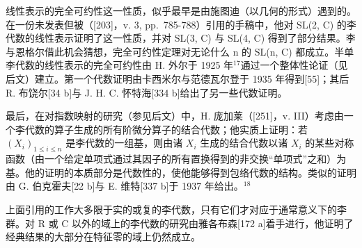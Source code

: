 线性表示的完全可约性这一性质，似乎最早是由施图迪（以几何的形式）遇到的。在一份未发表但被（{[}203{]}，v. 3, pp.~785-788）引用的手稿中，他对 SL(2, C) 的李代数的线性表示证明了这一性质，并对 SL(3, C) 与 SL(4, C) 得到了部分结果。李与恩格尔借此机会猜想，完全可约性定理对无论什么 n 的 SL(n, C) 都成立。半单李代数的线性表示的完全可约性由 H. 外尔于 1925 年\(^{17}\)通过一个整体性论证（见后文）建立。第一个代数证明由卡西米尔与范德瓦尔登于 1935 年得到{[}55{]}；其后 R. 布饶尔{[}34 b{]}与 J. H. C. 怀特海{[}334 b{]}给出了另一些代数证明。

最后，在对指数映射的研究（参见后文）中，H. 庞加莱（{[}251{]}，v. III）考虑由一个李代数的算子生成的所有阶微分算子的结合代数；他实质上证明：若 \((X_{i})_{1\leq i\leq n}\) 是李代数的一组基，则由诸 \(X_{i}\) 生成的结合代数以诸 \(X_{i}\) 的某些对称函数（由一个给定单项式通过其因子的所有置换得到的非交换“单项式”之和）为基。他的证明的本质部分是代数性的，使他能够得到包络代数的结构。类似的证明由 G. 伯克霍夫{[}22 b{]}与 E. 维特{[}337 b{]}于 1937 年给出。\(^{18}\)

上面引用的工作大多限于实的或复的李代数，只有它们才对应于通常意义下的李群。对 R 或 C 以外的域上的李代数的研究由雅各布森{[}172 a{]}着手进行，他证明了经典结果的大部分在特征零的域上仍然成立。

